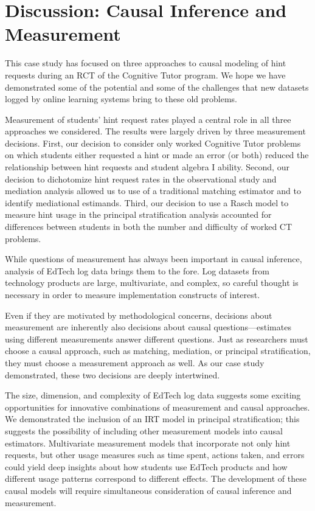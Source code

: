 \documentclass{article}\usepackage[]{graphicx}\usepackage[]{color}
\begin{document}
\section{Discussion: Causal Inference and Measurement}\label{sec:conclusion}
This case study has focused on three approaches to causal modeling of
hint requests during an RCT of the Cognitive Tutor program.
We hope we have demonstrated some of the potential and some of the
challenges that new datasets logged by online
learning systems bring to these old problems.

Measurement of students' hint request rates played a central role in all three approaches we considered.
The results were largely driven by three measurement decisions.
First, our decision to consider only worked Cognitive Tutor problems on which students either requested a hint or made an error (or both) reduced the relationship between hint requests and student algebra I ability.
Second, our decision to dichotomize hint request rates in the observational study and mediation analysis allowed us to use of a traditional matching estimator and to identify mediational estimands.
Third, our decision to use a Rasch model to measure hint usage in the principal stratification analysis accounted for differences between students in both the number and difficulty of worked CT problems.

While questions of measurement has always been important in causal inference, analysis of EdTech log data brings them to the fore.
Log datasets from technology products are large, multivariate, and complex, so careful thought is necessary in order to measure implementation constructs of interest.

Even if they are motivated by methodological concerns, decisions about measurement are inherently also decisions about causal questions---estimates using different measurements answer different questions.
Just as researchers must choose a causal approach, such as matching, mediation, or principal stratification, they must choose a measurement approach as well.
As our case study demonstrated, these two decisions are deeply intertwined.

The size, dimension, and complexity of EdTech log data suggests some exciting opportunities for innovative combinations of measurement and causal approaches.
We demonstrated the inclusion of an IRT model in principal stratification; this suggests the possibility of including other measurement models into causal estimators.
Multivariate measurement models that incorporate not only hint requests, but other usage measures such as time spent, actions taken, and errors could yield deep insights about how students use EdTech products and how different usage patterns correspond to different effects.
The development of these causal models will require simultaneous consideration of causal inference and measurement.
\end{document}
